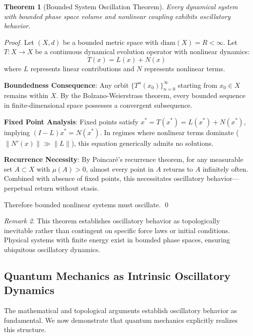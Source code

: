 \documentclass[11pt]{article}
\newtheorem{theorem}{Theorem}[section]
\theoremstyle{remark}
\newtheorem{remark}[theorem]{Remark}
\begin{document}
\begin{theorem}[Bounded System Oscillation Theorem]
\label{thm:bounded_oscillation}
Every dynamical system with bounded phase space volume and nonlinear coupling exhibits oscillatory behavior.
\end{theorem}

\begin{proof}
Let $(X, d)$ be a bounded metric space with $\text{diam}(X) = R < \infty$. Let $T: X \to X$ be a continuous dynamical evolution operator with nonlinear dynamics:
$$T(x) = L(x) + N(x)$$
where $L$ represents linear contributions and $N$ represents nonlinear terms.

\textbf{Boundedness Consequence}: Any orbit $\{T^n(x_0)\}_{n=0}^{\infty}$ starting from $x_0 \in X$ remains within $X$. By the Bolzano-Weierstrass theorem, every bounded sequence in finite-dimensional space possesses a convergent subsequence.

\textbf{Fixed Point Analysis}: Fixed points satisfy $x^* = T(x^*) = L(x^*) + N(x^*)$, implying $(I - L)x^* = N(x^*)$. In regimes where nonlinear terms dominate ($\|N'(x)\| \gg \|L\|$), this equation generically admits no solutions.

\textbf{Recurrence Necessity}: By Poincaré's recurrence theorem, for any measurable set $A \subset X$ with $\mu(A) > 0$, almost every point in $A$ returns to $A$ infinitely often. Combined with absence of fixed points, this necessitates oscillatory behavior—perpetual return without stasis.

Therefore bounded nonlinear systems must oscillate. \qed
\end{proof}

\begin{remark}
This theorem establishes oscillatory behavior as topologically inevitable rather than contingent on specific force laws or initial conditions. Physical systems with finite energy exist in bounded phase spaces, ensuring ubiquitous oscillatory dynamics.
\end{remark}

\subsection{Quantum Mechanics as Intrinsic Oscillatory Dynamics}

The mathematical and topological arguments establish oscillatory behavior as fundamental. We now demonstrate that quantum mechanics explicitly realizes this structure.
\end{document}
